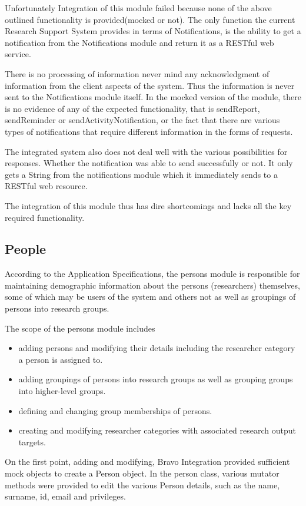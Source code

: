 \documentclass[a4paper,10pt]{article}
\begin{document}
Unfortunately Integration of this module failed because none of the above outlined functionality is provided(mocked or not). The only function the current Research Support System provides in terms of Notifications, is the ability to get a notification from the Notifications module and return it as a RESTful web service.

There is no processing of information never mind any acknowledgment of information from the client aspects of the system. Thus the information is never sent to the Notifications module itself. In the mocked version of the module, there is no evidence of any of the expected functionality, that is sendReport, sendReminder or sendActivityNotification, or the fact that there are various types of notifications that require different information in the forms of requests.

The integrated system also does not deal well with the various possibilities for responses. Whether the notification was able to send successfully or not. It only gets a String from the notifications module which it immediately sends to a RESTful web resource.

The integration of this module thus has dire shortcomings and lacks all the key required functionality.

\subsection{People}
According to the Application Specifications, the persons module is responsible for maintaining demographic information about the persons (researchers) themselves, some of which may be users of the system and others not as well as groupings of persons into research groups.

The scope of the persons module includes

\begin{itemize}
	\item adding persons and modifying their details including the researcher category a person is	assigned to.
	\item adding groupings of persons into research groups as well as grouping groups into higher-level groups.
	\item defining and changing group memberships of persons.
	\item creating and modifying researcher categories with associated research output targets.
\end{itemize}

	On the first point, adding and modifying, Bravo Integration provided sufficient mock objects to create a Person object. In the person class, various mutator methods were provided to edit the various Person details, such as the name, surname, id, email and privileges. 
	
\end{document}
